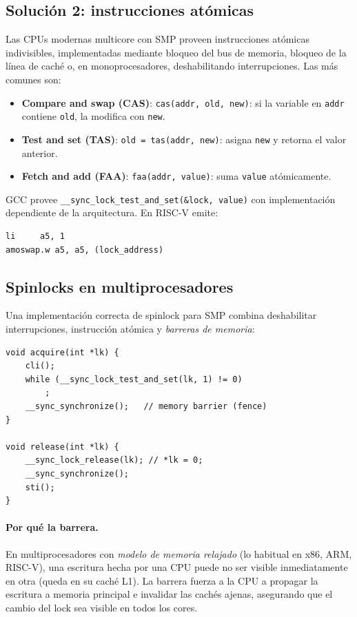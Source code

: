 \documentclass[11pt,a4paper]{article}
\begin{document}
\subsection{Solución 2: instrucciones atómicas}

Las CPUs modernas multicore con SMP proveen instrucciones atómicas
indivisibles, implementadas mediante bloqueo del bus de memoria,
bloqueo de la línea de caché o, en monoprocesadores, deshabilitando
interrupciones. Las más comunes son:

\begin{itemize}[leftmargin=*]
    \item \textbf{Compare and swap (CAS)}:
        \texttt{cas(addr, old, new)}: si la variable en \texttt{addr}
        contiene \texttt{old}, la modifica con \texttt{new}.
    \item \textbf{Test and set (TAS)}:
        \texttt{old = tas(addr, new)}: asigna \texttt{new} y retorna
        el valor anterior.
    \item \textbf{Fetch and add (FAA)}:
        \texttt{faa(addr, value)}: suma \texttt{value} atómicamente.
\end{itemize}

GCC provee \texttt{\_\_sync\_lock\_test\_and\_set(\&lock, value)}
con implementación dependiente de la arquitectura. En RISC-V emite:

\begin{lstlisting}[style=textstyle]
li     a5, 1
amoswap.w a5, a5, (lock_address)
\end{lstlisting}

\subsection{Spinlocks en multiprocesadores}

Una implementación correcta de spinlock para SMP combina
deshabilitar interrupciones, instrucción atómica y \emph{barreras
de memoria}:

\begin{lstlisting}[style=cstyle]
void acquire(int *lk) {
    cli();
    while (__sync_lock_test_and_set(lk, 1) != 0)
        ;
    __sync_synchronize();   // memory barrier (fence)
}

void release(int *lk) {
    __sync_lock_release(lk); // *lk = 0;
    __sync_synchronize();
    sti();
}
\end{lstlisting}

\paragraph{Por qué la barrera.} En multiprocesadores con \emph{modelo
de memoria relajado} (lo habitual en x86, ARM, RISC-V), una escritura
hecha por una CPU puede no ser visible inmediatamente en otra (queda
en su caché L1). La barrera fuerza a la CPU a propagar la escritura
a memoria principal e invalidar las cachés ajenas, asegurando que el
cambio del lock sea visible en todos los cores.
\end{document}
